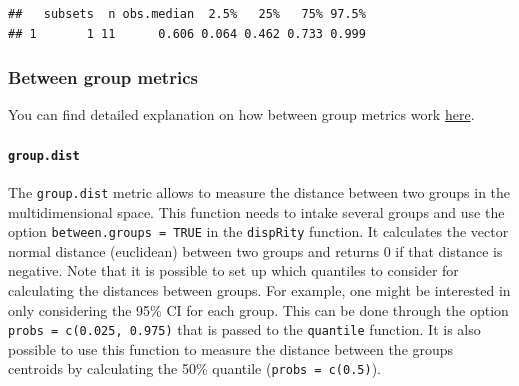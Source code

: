 \documentclass[]{book}
\newenvironment{Shaded}{\begin{snugshade}}{\end{snugshade}}
\newcommand{\CommentTok}[1]{\textcolor[rgb]{0.56,0.35,0.01}{\textit{#1}}}
\newcommand{\ControlFlowTok}[1]{\textcolor[rgb]{0.13,0.29,0.53}{\textbf{#1}}}
\newcommand{\DataTypeTok}[1]{\textcolor[rgb]{0.13,0.29,0.53}{#1}}
\newcommand{\DecValTok}[1]{\textcolor[rgb]{0.00,0.00,0.81}{#1}}
\newcommand{\KeywordTok}[1]{\textcolor[rgb]{0.13,0.29,0.53}{\textbf{#1}}}
\newcommand{\NormalTok}[1]{#1}
\newcommand{\OperatorTok}[1]{\textcolor[rgb]{0.81,0.36,0.00}{\textbf{#1}}}
\newcommand{\OtherTok}[1]{\textcolor[rgb]{0.56,0.35,0.01}{#1}}
\newcommand{\StringTok}[1]{\textcolor[rgb]{0.31,0.60,0.02}{#1}}
\let\oldparagraph\paragraph
\renewcommand{\paragraph}[1]{\oldparagraph{#1}\mbox{}}
\begin{document}
\begin{Shaded}
\end{Shaded}

\begin{verbatim}
##   subsets  n obs.median  2.5%   25%   75% 97.5%
## 1       1 11      0.606 0.064 0.462 0.733 0.999
\end{verbatim}

\hypertarget{betweengroupmetricslist}{%
\subsubsection{Between group metrics}\label{betweengroupmetricslist}}

You can find detailed explanation on how between group metrics work \protect\hyperlink{betweengroupmetricsexplain}{here}.

\hypertarget{group.dist}{%
\paragraph{\texorpdfstring{\texttt{group.dist}}{group.dist}}\label{group.dist}}

The \texttt{group.dist} metric allows to measure the distance between two groups in the multidimensional space.
This function needs to intake several groups and use the option \texttt{between.groups\ =\ TRUE} in the \texttt{dispRity} function.
It calculates the vector normal distance (euclidean) between two groups and returns 0 if that distance is negative.
Note that it is possible to set up which quantiles to consider for calculating the distances between groups.
For example, one might be interested in only considering the 95\% CI for each group.
This can be done through the option \texttt{probs\ =\ c(0.025,\ 0.975)} that is passed to the \texttt{quantile} function.
It is also possible to use this function to measure the distance between the groups centroids by calculating the 50\% quantile (\texttt{probs\ =\ c(0.5)}).
\end{document}
